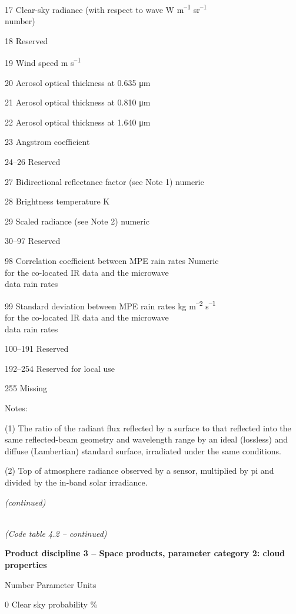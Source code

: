 17 Clear-sky radiance (with respect to wave W m\textsuperscript{--1} sr\textsuperscript{--1}\\
number)

18 Reserved

19 Wind speed m s\textsuperscript{--1}

20 Aerosol optical thickness at 0.635 μm

21 Aerosol optical thickness at 0.810 μm

22 Aerosol optical thickness at 1.640 μm

23 Angstrom coefficient

24--26 Reserved

27 Bidirectional reflectance factor (see Note 1) numeric

28 Brightness temperature K

29 Scaled radiance (see Note 2) numeric

30--97 Reserved

98 Correlation coefficient between MPE rain rates Numeric\\
for the co-located IR data and the microwave\\
data rain rates

99 Standard deviation between MPE rain rates kg m\textsuperscript{--2} s\textsuperscript{--1}\\
for the co-located IR data and the microwave\\
data rain rates

100--191 Reserved

192--254 Reserved for local use

255 Missing

Notes:

(1) The ratio of the radiant flux reflected by a surface to that reflected into the same reflected-beam geometry and wavelength range by an ideal (lossless) and diffuse (Lambertian) standard surface, irradiated under the same conditions.

(2) Top of atmosphere radiance observed by a sensor, multiplied by pi and divided by the in-band solar irradiance.

\emph{(continued)}

\emph{\\
(Code table 4.2 -- continued)}

\textbf{Product discipline 3 -- Space products, parameter category 2: cloud properties}

Number Parameter Units

0 Clear sky probability \%

